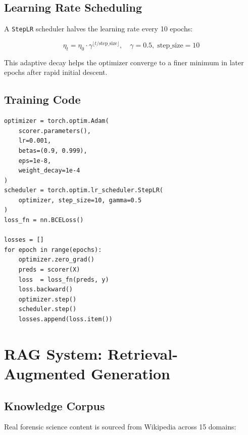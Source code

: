 \documentclass[12pt,a4paper]{article}
\begin{document}
\subsection{Learning Rate Scheduling}

A \texttt{StepLR} scheduler halves the learning rate every 10 epochs:

\begin{equation}
  \eta_t = \eta_0 \cdot \gamma^{\lfloor t/\text{step\_size} \rfloor}, \quad
  \gamma = 0.5,\;\text{step\_size} = 10
\end{equation}

This adaptive decay helps the optimizer converge to a finer minimum in later
epochs after rapid initial descent.

\subsection{Training Code}

\begin{lstlisting}[style=pythonstyle, caption={Adam Optimizer and Training Loop (vision.py)}]
optimizer = torch.optim.Adam(
    scorer.parameters(),
    lr=0.001,
    betas=(0.9, 0.999),
    eps=1e-8,
    weight_decay=1e-4
)
scheduler = torch.optim.lr_scheduler.StepLR(
    optimizer, step_size=10, gamma=0.5
)
loss_fn = nn.BCELoss()

losses = []
for epoch in range(epochs):
    optimizer.zero_grad()
    preds = scorer(X)
    loss  = loss_fn(preds, y)
    loss.backward()
    optimizer.step()
    scheduler.step()
    losses.append(loss.item())
\end{lstlisting}

\section{RAG System: Retrieval-Augmented Generation}

\subsection{Knowledge Corpus}

Real forensic science content is sourced from Wikipedia across 15 domains:
\end{document}
